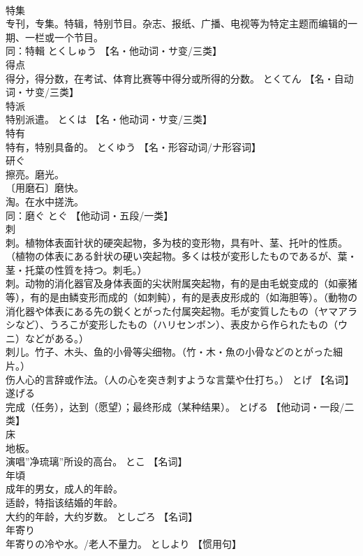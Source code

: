 \documentclass[8pt]{extreport}
\begin{document}
\begin{CJK}{UTF8}{min}
\\	特集	
\\	专刊，专集。特辑，特别节目。杂志、报纸、广播、电视等为特定主题而编辑的一期、一栏或一个节目。 
\\	同：特輯	とくしゅう		【名・他动词・サ变/三类】
\\	得点	
\\	得分，得分数，在考试、体育比赛等中得分或所得的分数。	とくてん		【名・自动词・サ变/三类】
\\	特派	
\\	特别派遣。	とくは		【名・他动词・サ变/三类】
\\	特有	
\\	特有，特别具备的。	とくゆう		【名・形容动词/ナ形容词】
\\	研ぐ	
\\	擦亮。磨光。 
\\	〔用磨石〕磨快。 
\\	淘。在水中搓洗。 
\\	同：磨ぐ	とぐ		【他动词・五段/一类】
\\	刺	
\\	刺。植物体表面针状的硬突起物，多为枝的变形物，具有叶、茎、托叶的性质。（植物の体表にある針状の硬い突起物。多くは枝が変形したものであるが、葉・茎・托葉の性質を持つ。刺毛。） 
\\	刺。动物的消化器官及身体表面的尖状附属突起物，有的是由毛蜕变成的（如豪猪等），有的是由鳞变形而成的（如刺鲀），有的是表皮形成的（如海胆等）。（動物の消化器や体表にある先の鋭くとがった付属突起物。毛が変質したもの（ヤマアラシなど）、うろこが変形したもの（ハリセンボン）、表皮から作られたもの（ウニ）などがある。） 
\\	刺儿。竹子、木头、鱼的小骨等尖细物。（竹・木・魚の小骨などのとがった細片。） 
\\	伤人心的言辞或作法。（人の心を突き刺すような言葉や仕打ち。）	とげ		【名词】
\\	遂げる	
\\	完成（任务），达到（愿望）；最终形成（某种结果）。	とげる		【他动词・一段/二类】
\\	床	
\\	地板。 
\\	演唱”净琉璃”所设的高台。	とこ		【名词】
\\	年頃	
\\	成年的男女，成人的年龄。 
\\	适龄，特指该结婚的年龄。 
\\	大约的年龄，大约岁数。	としごろ		【名词】
\\	年寄り	
\\	年寄りの冷や水。/老人不量力。	としより		【惯用句】

\end{CJK}
\end{document}
